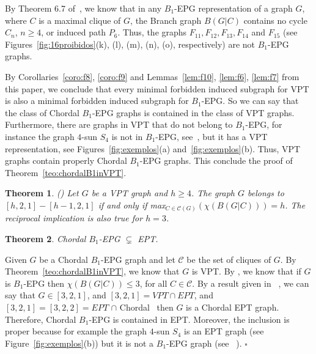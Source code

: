 \documentclass[9pt]{entcs}
\newtheorem{teo}{Theorem}[section]
\newcommand{\la}[1]{\textcolor{blue}{\sf{#1}}}%
\begin{document}
By Theorem 6.7 of~\cite{golumbic2009}, we know that in any $B_1$-EPG representation of a graph $G$, where $C$ is a maximal clique of $G$, the Branch graph $B(G|C)$ contains no \la{induced} cycle $C_n$,  $n\geq 4$, or induced path $P_6$. Thus, the graphs $F_{11}, F_{12}, F_{13}, F_{14}$ and $F_{15}$  (see Figures~\ref{fig:16proibidos}(k), (l), (m), (n), (o), respectively)  are not $B_1$-EPG graphs.

By Corollaries~\ref{coro:f8}, \ref{coro:f9} and Lemmas~\ref{lem:f10}, \ref{lem:f6}, \ref{lem:f7} from this paper, we conclude that every minimal forbidden induced subgraph for VPT is also a minimal forbidden induced subgraph for $B_1$-EPG. So we can say that the class of Chordal $B_1$-EPG graphs is contained in the class of VPT graphs. Furthermore, there are graphs in VPT that do not belong to $B_1$-EPG, for instance the graph $4$-sun $S_4$ is not in $B_1$-EPG, see~\cite{golumbic2009}, but it has a VPT representation, see Figures~\ref{fig:exemplos}(a) and~\ref{fig:exemplos}(b). Thus, VPT graphs contain properly Chordal $B_1$-EPG graphs. This conclude the proof of Theorem~\ref{teo:chordalB1inVPT}.



\begin{teo}
(\cite{alcon2014recognizing}) Let $G$ be a VPT graph and $h\geq 4$. The graph $G$ belongs to $[h,2,1]-[h-1,2,1]$ if and only if max$_{C\in\mathcal{C}(G)}(\chi (B(G|C)))=h$. The reciprocal implication is also true for $h=3$.
\end{teo}


\begin{teo}\label{teo:b1epgept}
Chordal $B_1$-EPG $\subsetneq$ EPT. 
\end{teo}

\begin{pf}
Given $G$ be a  Chordal $B_1$-EPG graph and let  $\mathcal{C}$  be the set of cliques of $G$. By Theorem~\ref{teo:chordalB1inVPT}, we know that $G$ is VPT. By \cite{golumbic2009}, we know that if $G$ is $B_1$-EPG then $\chi (B(G|C))\leq 3$,  for all $C \in \mathcal{C}$. By a result given in ~\cite{alcon2014recognizing}, we can say that $G \in [3,2,1]$, and $[3,2,1] = VPT \cap EPT$, and $[3,2,1] = [3,2,2] = EPT$ $\cap$ Chordal~\cite{golumbic1985} then $G$ is a Chordal EPT graph. Therefore, Chordal $B_1$-EPG is contained in EPT. Moreover, the inclusion is proper because for example the graph $4$-sun $S_4$ is an EPT graph (see Figure~\ref{fig:exemplos}(b)) but it is not a $B_1$-EPG graph (see ~\cite{golumbic2009}).
 $\square$\end{pf} 
\end{document}
